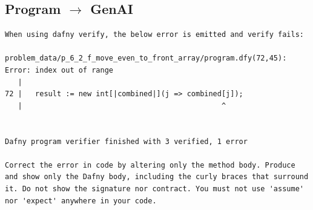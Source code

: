 \documentclass{article}
\begin{document}
\subsection*{Program $\rightarrow$ GenAI}
\begin{lstlisting}
When using dafny verify, the below error is emitted and verify fails:

problem_data/p_6_2_f_move_even_to_front_array/program.dfy(72,45): Error: index out of range
   |
72 |   result := new int[|combined|](j => combined[j]);
   |                                              ^


Dafny program verifier finished with 3 verified, 1 error

Correct the error in code by altering only the method body. Produce and show only the Dafny body, including the curly braces that surround it. Do not show the signature nor contract. You must not use 'assume' nor 'expect' anywhere in your code.
\end{lstlisting}
\end{document}
